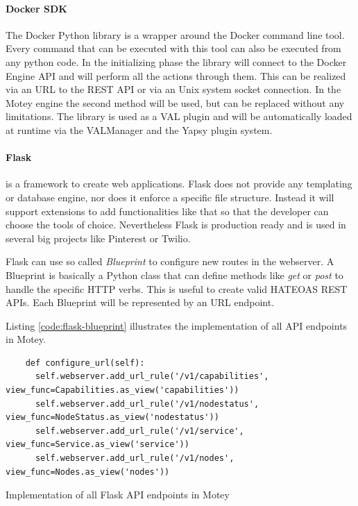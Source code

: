\paragraph{Docker \ac{SDK}}
The Docker Python library is a wrapper around the Docker command line tool.
Every command that can be executed with this tool can also be executed from any python code.
In the initializing phase the library will connect to the Docker Engine \ac{API} and will perform all the actions through them.
This can be realized via an \ac{URL} to the \ac{REST} \ac{API} or via an Unix system socket connection.
In the Motey engine the second method will be used, but can be replaced without any limitations.
The library is used as a \ac{VAL} plugin and will be automatically loaded at runtime via the VALManager and the Yapsy plugin system.

\paragraph{Flask} is a framework to create web applications.
Flask does not provide any templating or database engine, nor does it enforce a specific file structure.
Instead it will support extensions to add functionalities like that so that the developer can choose the tools of choice.\autocite[cf.]{Flask:Documentation:Foreword}
Nevertheless Flask is production ready and is used in several big projects like Pinterest\autocite{Quora:Pinterest:Flask} or Twilio\autocite{Twilio:Flask}.

Flask can use so called \textit{Blueprint} to configure new routes in the webserver.
A Blueprint is basically a Python class that can define methods like \textit{get} or \textit{post} to handle the specific \ac{HTTP} verbs.
This is useful to create valid \ac{HATEOAS} \ac{REST} \acp{API}.
Each Blueprint will be represented by an \ac{URL} endpoint.

Listing \ref{code:flask-blueprint} illustrates the implementation of all \ac{API} endpoints in Motey.
\begin{listing}[H]
  \begin{verbatim}
    def configure_url(self):
      self.webserver.add_url_rule('/v1/capabilities', view_func=Capabilities.as_view('capabilities'))
      self.webserver.add_url_rule('/v1/nodestatus', view_func=NodeStatus.as_view('nodestatus'))
      self.webserver.add_url_rule('/v1/service', view_func=Service.as_view('service'))
      self.webserver.add_url_rule('/v1/nodes', view_func=Nodes.as_view('nodes'))
  \end{verbatim}
  \caption{Implementation of all Flask \ac{API} endpoints in Motey}
  \label{code:flask-blueprint}
\end{listing}

